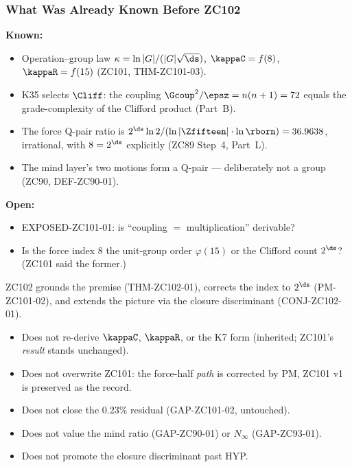 \documentclass[12pt, a4paper]{article}
\begin{document}
\subsubsection{What Was Already Known Before ZC102}

\begin{keybox}[title={Pre-ZC102 Status}]
\textbf{Known:}
\begin{itemize}[leftmargin=2em, noitemsep]
  \item Operation--group law $\kappa=\ln|G|/(|G|\sqrt{\ds})$, $\kappaC=f(8)$,
    $\kappaR=f(15)$ (ZC101, THM-ZC101-03).
  \item K35 selects $\Cliff$: the coupling $\Gcoup^2/\epsz=n(n+1)=72$ equals the
    grade-complexity of the Clifford product (Part~B).
  \item The force Q-pair ratio is $2^{\ds}\ln2/(\ln|\Zfifteen|\cdot\ln\rborn)
    =36.9638$, irrational, with $8=2^{\ds}$ explicitly (ZC89 Step~4, Part~L).
  \item The mind layer's two motions form a Q-pair --- deliberately not a group
    (ZC90, DEF-ZC90-01).
\end{itemize}

\textbf{Open:}
\begin{itemize}[leftmargin=2em, noitemsep]
  \item EXPOSED-ZC101-01: is ``coupling $=$ multiplication'' derivable?
  \item Is the force index $8$ the unit-group order $\varphi(15)$ or the
    Clifford count $2^{\ds}$? (ZC101 said the former.)
\end{itemize}

ZC102 grounds the premise (THM-ZC102-01), corrects the index to $2^{\ds}$
(PM-ZC101-02), and extends the picture via the closure discriminant
(CONJ-ZC102-01).
\end{keybox}

\begin{keybox}[title={What ZC102 Does NOT Do}]
\begin{itemize}[leftmargin=2em, noitemsep]
  \item Does not re-derive $\kappaC$, $\kappaR$, or the K7 form (inherited;
    ZC101's \emph{result} stands unchanged).
  \item Does not overwrite ZC101: the force-half \emph{path} is corrected by PM,
    ZC101 v1 is preserved as the record.
  \item Does not close the $0.23\%$ residual (GAP-ZC101-02, untouched).
  \item Does not value the mind ratio (GAP-ZC90-01) or $N_\infty$
    (GAP-ZC93-01).
  \item Does not promote the closure discriminant past HYP.
\end{itemize}
\end{keybox}
\end{document}
